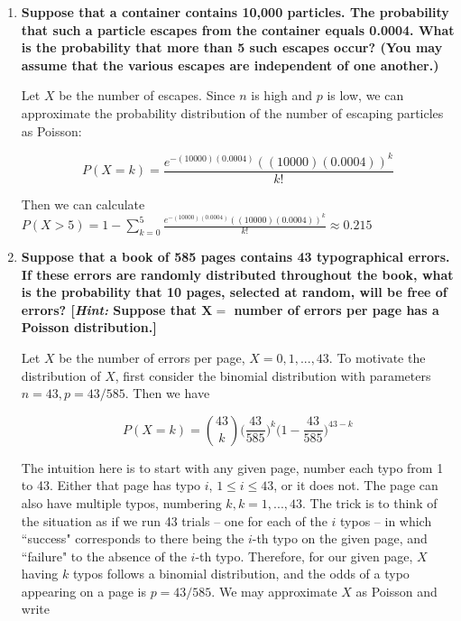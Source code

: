 \documentclass[10pt, oneside]{article}
\begin{document}
\begin{enumerate}[label=8.\arabic*]
\begin{enumerate}
	Inputting into the derived expression above gives us $\boxed{P(Y = 0) \approx 0.0273}$.
	\end{enumerate}

\newpage
\item  \begin{tcolorbox}[
  colback=Cerulean!5!white,
  colframe=Cerulean!75!black]
\textbf{Suppose that a container contains 10,000 particles. The probability that such a particle escapes from the container equals 0.0004. What is the probability that more than 5 such escapes occur? (You may assume that the various escapes are independent of one another.)}
\end{tcolorbox}

Let $X$ be the number of escapes. Since $n$ is high and $p$ is low, we can approximate the probability distribution of the number of escaping particles as Poisson:

\[ P(X = k) = \frac{e^{-(10000)(0.0004)} ((10000)(0.0004))^k}{k!} \]

Then we can calculate $P(X > 5) = 1 - \sum^5_{k=0} \frac{e^{-(10000)(0.0004)} ((10000)(0.0004))^k}{k!} \approx \boxed{0.215} $

\item  \begin{tcolorbox}[
  colback=Cerulean!5!white,
  colframe=Cerulean!75!black]
\textbf{Suppose that a book of 585 pages contains 43 typographical errors. If these errors are randomly distributed throughout the book, what is the probability that 10 pages, selected at random, will be free of errors? [\textit{Hint:} Suppose that $\bm{X =}$ number of errors per page has a Poisson distribution.]}
\end{tcolorbox}

Let $X$ be the number of errors per page, $X = 0, 1, ..., 43$. To motivate the distribution of $X$, first consider the binomial distribution with parameters $n = 43, p = 43/585$. Then we have

\[ P(X = k) = \binom{43}{k} \Bigg( \frac{43}{585} \Bigg)^k \Bigg( 1 - \frac{43}{585} \Bigg)^{43-k} \]

The intuition here is to start with any given page, number each typo from 1 to 43. Either that page has typo $i$, $1 \leq i \leq 43$, or it does not. The page can also have multiple typos, numbering $k, k = 1, ..., 43$. The trick is to think of the situation as if we run 43 trials -- one for each of the $i$ typos -- in which ``success" corresponds to there being the $i$-th typo on the given page, and ``failure" to the absence of the $i$-th typo. Therefore, for our given page, $X$ having $k$ typos follows a binomial distribution, and the odds of a typo appearing on a page is $p = 43/585$. We may approximate $X$ as Poisson and write


\end{enumerate}
\end{document}
